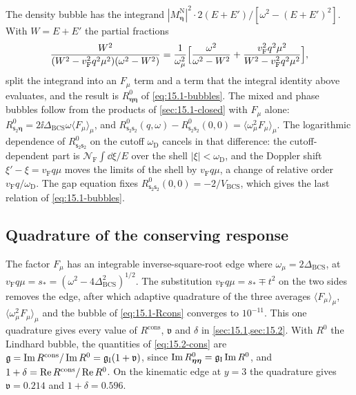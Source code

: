 The density bubble has the integrand $|M^{\mathrm{N}}_{\boldsymbol{\eta}}|^2\cdot 2(E + E')/[\omega^2 - (E + E')^2]$. With $W = E + E'$ the partial fractions
\begin{equation*}
  \frac{W^2}{(W^2 - v_{\mathrm{F}}^2q^2\mu^2)(\omega^2 - W^2)} = \frac{1}{\omega_\mu^2}\Bigl[\frac{\omega^2}{\omega^2 - W^2} + \frac{v_{\mathrm{F}}^2q^2\mu^2}{W^2 - v_{\mathrm{F}}^2q^2\mu^2}\Bigr] ,
\end{equation*}
split the integrand into an $F_\mu$ term and a term that the integral identity above evaluates, and the result is $R^0_{\boldsymbol{\eta}\boldsymbol{\eta}}$ of \cref{eq:15.1-bubbles}. The mixed and phase bubbles follow from the products of \cref{sec:15.1-closed} with $F_\mu$ alone: $R^0_{\mathsf{s}_2\boldsymbol{\eta}} = 2\ii\Delta_{\mathrm{BCS}}\omega\langle F_\mu\rangle_\mu$, and $R^0_{\mathsf{s}_2\mathsf{s}_2}(q,\omega) - R^0_{\mathsf{s}_2\mathsf{s}_2}(0,0) = \langle\omega_\mu^2F_\mu\rangle_\mu$. The logarithmic dependence of $R^0_{\mathsf{s}_2\mathsf{s}_2}$ on the cutoff $\omega_{\mathrm{D}}$ cancels in that difference: the cutoff-dependent part is $\mathcal{N}_{\mathrm{F}}\int\dd\xi/E$ over the shell $|\xi| < \omega_{\mathrm{D}}$, and the Doppler shift $\xi' - \xi = v_{\mathrm{F}}q\mu$ moves the limits of the shell by $v_{\mathrm{F}}q\mu$, a change of relative order $v_{\mathrm{F}}q/\omega_{\mathrm{D}}$. The gap equation fixes $R^0_{\mathsf{s}_2\mathsf{s}_2}(0,0) = -2/V_{\mathrm{BCS}}$, which gives the last relation of \cref{eq:15.1-bubbles}.

\subsection*{Quadrature of the conserving response}

The factor $F_\mu$ has an integrable inverse-square-root edge where $\omega_\mu = 2\Delta_{\mathrm{BCS}}$, at $v_{\mathrm{F}}q\mu = s_* = (\omega^2 - 4\Delta_{\mathrm{BCS}}^2)^{1/2}$. The substitution $v_{\mathrm{F}}q\mu = s_* \mp t^2$ on the two sides removes the edge, after which adaptive quadrature of the three averages $\langle F_\mu\rangle_\mu$, $\langle\omega_\mu^2F_\mu\rangle_\mu$ and the bubble of \cref{eq:15.1-Rcons} converges to $10^{-11}$. This one quadrature gives every value of $R^{\mathrm{cons}}$, $\mathfrak{v}$ and $\delta$ in \cref{sec:15.1,sec:15.2}. With $R^0$ the Lindhard bubble, the quantities of \cref{eq:15.2-cons} are $\mathfrak{g} = \operatorname{Im} R^{\mathrm{cons}}/\operatorname{Im} R^0 = \mathfrak{g}_{\mathrm{I}}(1 + \mathfrak{v})$, since $\operatorname{Im} R^0_{\boldsymbol{\eta}\boldsymbol{\eta}} = \mathfrak{g}_{\mathrm{I}}\operatorname{Im} R^0$, and $1 + \delta = \operatorname{Re} R^{\mathrm{cons}}/\operatorname{Re} R^0$. On the kinematic edge at $y = 3$ the quadrature gives $\mathfrak{v} = 0.214$ and $1 + \delta = 0.596$.

